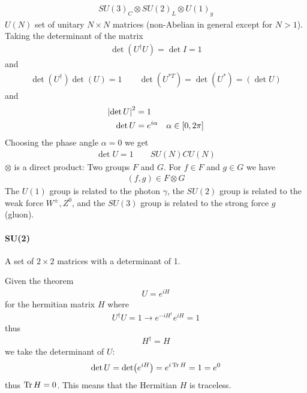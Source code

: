 \documentclass[../main.tex]{subfiles}
\begin{document}
\begin{align*}
    SU(3)_C \otimes SU(2)_L \otimes U(1)_y
\end{align*}
$U(N)$ set of unitary $N \times N$ matrices (non-Abelian in general except for $N>1$). Taking the 
determinant of the matrix
\begin{align*}
    \det (U^\dagger U) = \det I = 1 
\end{align*}
and 
\begin{align*}
    \det (U^\dagger) \det (U) = 1 \qquad \det (U^{*T}) = \det (U^*) = (\det U)
\end{align*}
and
\begin{align*}
    \abs{\det U}^2 &= 1 \\
    \det U &= e^{i\alpha} \quad \alpha \in [0, 2\pi]
\end{align*}
Choosing the phase angle $\alpha = 0$ we get
\begin{align*}
    \det U = 1 \qquad SU(N) C U(N)
\end{align*}
$\otimes$ is a direct product: Two groups $F$ and $G$. For $f \in F$ and $g \in G$ we have
\begin{align*}
    (f, g) \in F \otimes G
\end{align*}
The $U(1)$ group is related to the photon $\gamma$, the $SU(2)$ group is related to the weak force
$W^\pm, Z^0$, and the $SU(3)$ group is related to the strong force $g$ (gluon).

\paragraph{SU(2)} A set of $2 \times 2$ matrices with a determinant of 1.

Given the theorem
\begin{align*}
    U = e^{iH}
\end{align*}
for the hermitian matrix $H$ where
\begin{align*}
    U^\dagger U = 1 \rightarrow e^{-iH^\dagger} e^{iH} = 1
\end{align*}
thus
\begin{align*}
    H^\dagger = H
\end{align*}
we take the determinant of $U$:
\begin{align*}
    \det U = \det(e^{iH}) = e^{i\Tr H} = 1 = e^0
\end{align*}
thus $\Tr H = 0$. This means that the Hermitian $H$ is traceless.
\end{document}
